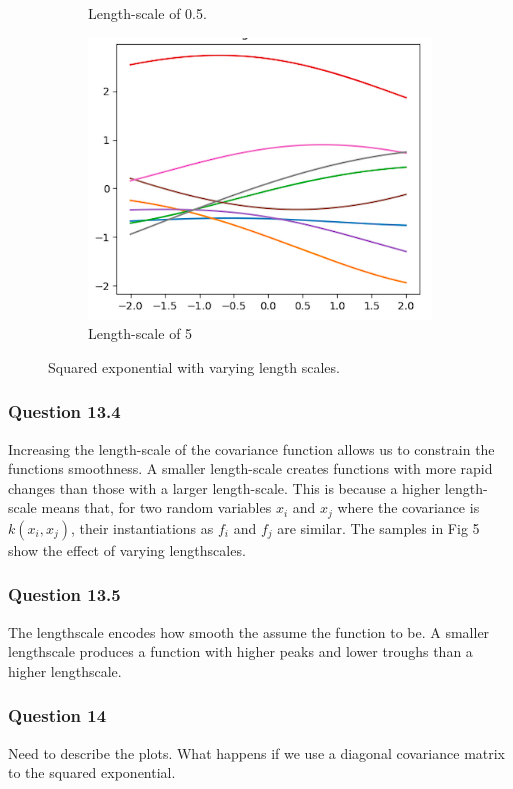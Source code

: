 \documentclass[10pt, a4paper, twocolumn]{article} %
\begin{document}
\begin{figure}[!htb]
\begin{subfigure}{.5\linewidth}
  \caption{Length-scale of 0.5.}
  \label{fig:sub2}
\end{subfigure}
\begin{subfigure}{.5\linewidth}
\centering
\includegraphics[width=0.9\linewidth]{ls5.png}
\caption{Length-scale of 5}
\end{subfigure}
\caption{Squared exponential with varying length scales. }
\label{fig:test}
\end{figure}

\subsubsection*{Question 13.4}
Increasing the length-scale of the covariance function allows us to constrain the functions smoothness. A smaller length-scale creates  functions with more rapid changes than those with a larger length-scale. This is because a higher length-scale means that, for two random variables $x_i$ and $x_j$ where the covariance is $k(x_i, x_j)$, their instantiations as $f_i$ and $f_j$ are similar. 
The samples in Fig 5 show the effect of varying lengthscales. 

\subsubsection*{Question 13.5}
The lengthscale encodes how smooth the assume the function to be. A smaller lengthscale produces a function with higher peaks and lower troughs than a higher lengthscale. 

\subsubsection{Question 14}
Need to describe the plots. What happens if we use a diagonal covariance matrix to the squared exponential. 
\end{document}
